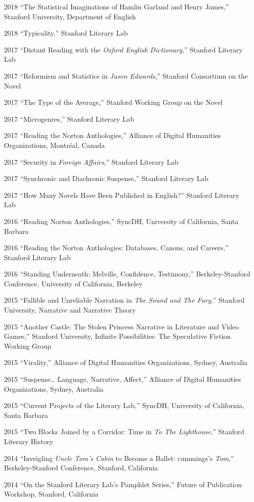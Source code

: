 \documentclass[12pt,letterpaper]{report}
\begin{document}
\begin{tablist}
	\item[2018] \tab{}\enquote{The Statistical Imaginations of Hamlin Garland and Henry James,} Stanford University, Department of English
	\item[2018] \tab{}\enquote{Typicality,} Stanford Literary Lab
	\item[2017] \tab{}\enquote{Distant Reading with the \emph{Oxford English Dictionary},} Stanford Literary Lab
	\item[2017] \tab{}\enquote{Reformism and Statistics in \emph{Jason Edwards},} Stanford Consortium on the Novel
	\item[2017] \tab{}\enquote{The Type of the Average,} Stanford Working Group on the Novel
	\item[2017] \tab{}\enquote{Microgenres,} Stanford Literary Lab
	\item[2017] \tab{}\enquote{Reading the Norton Anthologies,} Alliance of Digital Humanities Organizations, Montréal, Canada
	\item[2017] \tab{}\enquote{Security in \emph{Foreign Affairs},} Stanford Literary Lab
	\item[2017] \tab{}\enquote{Synchronic and Diachronic Suspense,} Stanford Literary Lab
	\item[2017] \tab{}\enquote{How Many Novels Have Been Published in English?} Stanford Literary Lab
	\item[2016] \tab{}\enquote{Reading Norton Anthologies,} SyncDH, University of California, Santa Barbara
	\item[2016] \tab{}\enquote{Reading the Norton Anthologies: Databases, Canons, and Careers,} Stanford Literary Lab
	\item[2016] \tab{}\enquote{Standing Underneath: Melville, Confidence, Testimony,} Berkeley-Stanford Conference, University of California, Berkeley
	\item[2015] \tab{}\enquote{Fallible and Unreliable Narration in \emph{The Sound and The Fury},} Stanford University, Narrative and Narrative Theory
	\item[2015] \tab{}\enquote{Another Castle: The Stolen Princess Narrative in Literature and Video Games,} Stanford University, Infinite Possibilities: The Speculative Fiction Working Group
	\item[2015] \tab{}\enquote{Virality,} Alliance of Digital Humanities Organizations, Sydney, Australia
	\item[2015] \tab{}\enquote{Suspense… Language, Narrative, Affect,} Alliance of Digital Humanities Organizations, Sydney, Australia
	\item[2015] \tab{}\enquote{Current Projects of the Literary Lab,} SyncDH, University of California, Santa Barbara
	\item[2015] \tab{}\enquote{Two Blocks Joined by a Corridor: Time in \emph{To The Lighthouse},} Stanford Literary History
	\item[2014] \tab{}\enquote{Inveigling \emph{Uncle Tom's Cabin} to Become a Ballet: cummings's \emph{Tom},} Berkeley-Stanford Conference, Stanford, California
	\item[2014] \tab{}\enquote{On the Stanford Literary Lab's Pamphlet Series,} Future of Publication Workshop, Stanford, California
\end{tablist}
\end{document}
